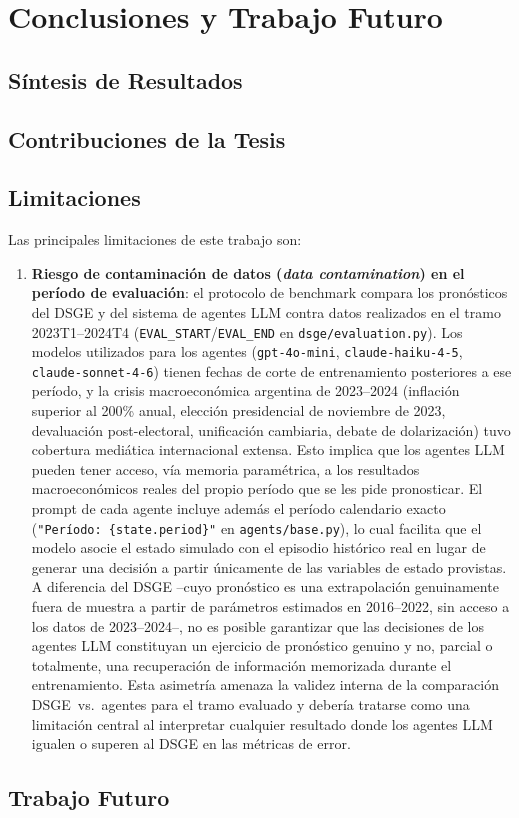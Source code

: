 
\chapter{Conclusiones y Trabajo Futuro}
\label{chap:conclusiones}

\section{Síntesis de Resultados}
\label{sec:sintesis}

\section{Contribuciones de la Tesis}
\label{sec:contribuciones-finales}

\section{Limitaciones}
\label{sec:limitaciones}

Las principales limitaciones de este trabajo son:

\begin{enumerate}
  \item \textbf{Riesgo de contaminación de datos (\textit{data contamination}) en el
  período de evaluación}: el protocolo de benchmark compara los pronósticos del DSGE
  y del sistema de agentes LLM contra datos realizados en el tramo
  2023T1--2024T4 (\texttt{EVAL\_START}/\texttt{EVAL\_END} en
  \texttt{dsge/evaluation.py}). Los modelos utilizados para los agentes
  (\texttt{gpt-4o-mini}, \texttt{claude-haiku-4-5}, \texttt{claude-sonnet-4-6}) tienen
  fechas de corte de entrenamiento posteriores a ese período, y la crisis
  macroeconómica argentina de 2023--2024 (inflación superior al 200\% anual,
  elección presidencial de noviembre de 2023, devaluación post-electoral,
  unificación cambiaria, debate de dolarización) tuvo cobertura mediática
  internacional extensa. Esto implica que los agentes LLM pueden tener acceso, vía
  memoria paramétrica, a los resultados macroeconómicos reales del propio período
  que se les pide pronosticar. El prompt de cada agente incluye además el período
  calendario exacto (\texttt{"Período: \{state.period\}"} en
  \texttt{agents/base.py}), lo cual facilita que el modelo asocie el estado
  simulado con el episodio histórico real en lugar de generar una decisión a partir
  únicamente de las variables de estado provistas. A diferencia del DSGE --cuyo
  pronóstico es una extrapolación genuinamente fuera de muestra a partir de
  parámetros estimados en 2016--2022, sin acceso a los datos de 2023--2024--, no es
  posible garantizar que las decisiones de los agentes LLM constituyan un ejercicio
  de pronóstico genuino y no, parcial o totalmente, una recuperación de información
  memorizada durante el entrenamiento. Esta asimetría amenaza la validez interna de
  la comparación DSGE~vs.~agentes para el tramo evaluado y debería tratarse como una
  limitación central al interpretar cualquier resultado donde los agentes LLM
  igualen o superen al DSGE en las métricas de error.

\end{enumerate}

\section{Trabajo Futuro}
\label{sec:trabajo-futuro}
